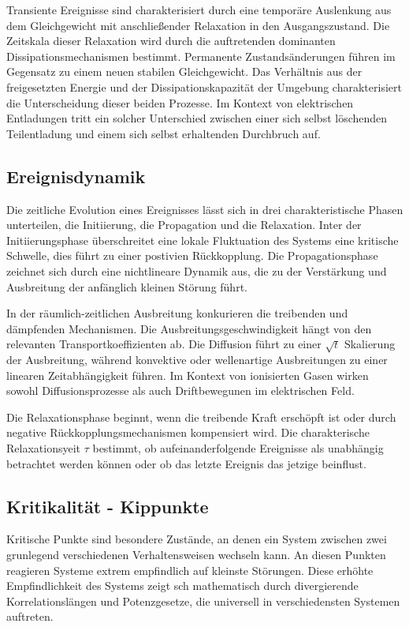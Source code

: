 Transiente Ereignisse sind charakterisiert durch eine temporäre Auslenkung aus dem Gleichgewicht mit anschließender Relaxation in den Ausgangszustand. Die Zeitskala dieser Relaxation wird durch die auftretenden dominanten Dissipationsmechanismen bestimmt. Permanente Zustandsänderungen führen im Gegensatz zu einem neuen stabilen Gleichgewicht. Das Verhältnis aus der freigesetzten Energie und der Dissipationskapazität der Umgebung charakterisiert die Unterscheidung dieser beiden Prozesse. Im Kontext von elektrischen Entladungen tritt ein solcher Unterschied zwischen einer sich selbst löschenden Teilentladung und einem sich selbst erhaltenden Durchbruch auf.

\subsection{Ereignisdynamik}
Die zeitliche Evolution eines Ereignisses lässt sich in drei charakteristische Phasen unterteilen, die Initiierung, die Propagation und die Relaxation. Inter der Initiierungsphase überschreitet eine lokale Fluktuation des Systems eine kritische Schwelle, dies führt zu einer postivien Rückkopplung. Die Propagationsphase zeichnet sich durch eine nichtlineare Dynamik aus, die zu der Verstärkung und Ausbreitung der anfänglich kleinen Störung führt.

In der räumlich-zeitlichen Ausbreitung konkurieren die treibenden und dämpfenden Mechanismen. Die Ausbreitungsgeschwindigkeit hängt von den relevanten Transportkoeffizienten ab. Die Diffusion führt zu einer \(\sqrt{t}\) Skalierung der Ausbreitung, während konvektive oder wellenartige Ausbreitungen zu einer linearen Zeitabhängigkeit führen. Im Kontext von ionisierten Gasen wirken sowohl Diffusionsprozesse als auch Driftbewegunen im elektrischen Feld. 

Die Relaxationsphase beginnt, wenn die treibende Kraft erschöpft ist oder durch negative Rückkopplungsmechanismen kompensiert wird. Die charakterische Relaxationsyeit \(\tau\) bestimmt, ob aufeinanderfolgende Ereignisse als unabhängig betrachtet werden können oder ob das letzte Ereignis das jetzige beinflust.

\subsection{Kritikalität - Kippunkte}
\label{sec:critpoint}
Kritische Punkte sind besondere Zustände, an denen ein System zwischen zwei grunlegend verschiedenen Verhaltensweisen wechseln kann. An diesen Punkten reagieren Systeme extrem empfindlich auf kleinste Störungen. Diese erhöhte Empfindlichkeit des Systems zeigt sch mathematisch durch divergierende Korrelationslängen und Potenzgesetze, die universell in verschiedensten Systemen auftreten. 


